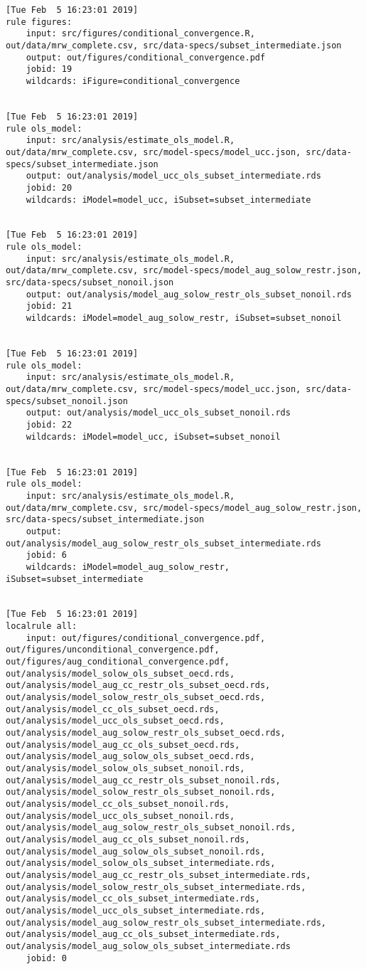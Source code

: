 \documentclass[]{book}
\theoremstyle{definition}
\theoremstyle{definition}
\theoremstyle{definition}
\theoremstyle{remark}
\begin{document}
\begin{verbatim}
[Tue Feb  5 16:23:01 2019]
rule figures:
    input: src/figures/conditional_convergence.R, out/data/mrw_complete.csv, src/data-specs/subset_intermediate.json
    output: out/figures/conditional_convergence.pdf
    jobid: 19
    wildcards: iFigure=conditional_convergence


[Tue Feb  5 16:23:01 2019]
rule ols_model:
    input: src/analysis/estimate_ols_model.R, out/data/mrw_complete.csv, src/model-specs/model_ucc.json, src/data-specs/subset_intermediate.json
    output: out/analysis/model_ucc_ols_subset_intermediate.rds
    jobid: 20
    wildcards: iModel=model_ucc, iSubset=subset_intermediate


[Tue Feb  5 16:23:01 2019]
rule ols_model:
    input: src/analysis/estimate_ols_model.R, out/data/mrw_complete.csv, src/model-specs/model_aug_solow_restr.json, src/data-specs/subset_nonoil.json
    output: out/analysis/model_aug_solow_restr_ols_subset_nonoil.rds
    jobid: 21
    wildcards: iModel=model_aug_solow_restr, iSubset=subset_nonoil


[Tue Feb  5 16:23:01 2019]
rule ols_model:
    input: src/analysis/estimate_ols_model.R, out/data/mrw_complete.csv, src/model-specs/model_ucc.json, src/data-specs/subset_nonoil.json
    output: out/analysis/model_ucc_ols_subset_nonoil.rds
    jobid: 22
    wildcards: iModel=model_ucc, iSubset=subset_nonoil


[Tue Feb  5 16:23:01 2019]
rule ols_model:
    input: src/analysis/estimate_ols_model.R, out/data/mrw_complete.csv, src/model-specs/model_aug_solow_restr.json, src/data-specs/subset_intermediate.json
    output: out/analysis/model_aug_solow_restr_ols_subset_intermediate.rds
    jobid: 6
    wildcards: iModel=model_aug_solow_restr, iSubset=subset_intermediate


[Tue Feb  5 16:23:01 2019]
localrule all:
    input: out/figures/conditional_convergence.pdf, out/figures/unconditional_convergence.pdf, out/figures/aug_conditional_convergence.pdf, out/analysis/model_solow_ols_subset_oecd.rds, out/analysis/model_aug_cc_restr_ols_subset_oecd.rds, out/analysis/model_solow_restr_ols_subset_oecd.rds, out/analysis/model_cc_ols_subset_oecd.rds, out/analysis/model_ucc_ols_subset_oecd.rds, out/analysis/model_aug_solow_restr_ols_subset_oecd.rds, out/analysis/model_aug_cc_ols_subset_oecd.rds, out/analysis/model_aug_solow_ols_subset_oecd.rds, out/analysis/model_solow_ols_subset_nonoil.rds, out/analysis/model_aug_cc_restr_ols_subset_nonoil.rds, out/analysis/model_solow_restr_ols_subset_nonoil.rds, out/analysis/model_cc_ols_subset_nonoil.rds, out/analysis/model_ucc_ols_subset_nonoil.rds, out/analysis/model_aug_solow_restr_ols_subset_nonoil.rds, out/analysis/model_aug_cc_ols_subset_nonoil.rds, out/analysis/model_aug_solow_ols_subset_nonoil.rds, out/analysis/model_solow_ols_subset_intermediate.rds, out/analysis/model_aug_cc_restr_ols_subset_intermediate.rds, out/analysis/model_solow_restr_ols_subset_intermediate.rds, out/analysis/model_cc_ols_subset_intermediate.rds, out/analysis/model_ucc_ols_subset_intermediate.rds, out/analysis/model_aug_solow_restr_ols_subset_intermediate.rds, out/analysis/model_aug_cc_ols_subset_intermediate.rds, out/analysis/model_aug_solow_ols_subset_intermediate.rds
    jobid: 0


\end{verbatim}
\end{document}
